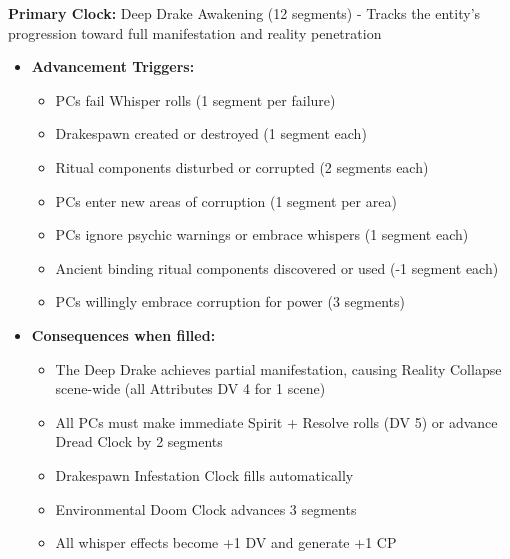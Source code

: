 \documentclass[11pt]{article}
\begin{document}
\textbf{Primary Clock:} Deep Drake Awakening (12 segments) - Tracks the entity's progression toward full manifestation and reality penetration
\begin{itemize}
\item \textbf{Advancement Triggers:}
  \begin{itemize}
  \item PCs fail Whisper rolls (1 segment per failure)
  \item Drakespawn created or destroyed (1 segment each)
  \item Ritual components disturbed or corrupted (2 segments each)
  \item PCs enter new areas of corruption (1 segment per area)
  \item PCs ignore psychic warnings or embrace whispers (1 segment each)
  \item Ancient binding ritual components discovered or used (-1 segment each)
  \item PCs willingly embrace corruption for power (3 segments)
  \end{itemize}
\item \textbf{Consequences when filled:}
  \begin{itemize}
  \item The Deep Drake achieves partial manifestation, causing Reality Collapse scene-wide (all Attributes DV 4 for 1 scene)
  \item All PCs must make immediate Spirit + Resolve rolls (DV 5) or advance Dread Clock by 2 segments
  \item Drakespawn Infestation Clock fills automatically
  \item Environmental Doom Clock advances 3 segments
  \item All whisper effects become +1 DV and generate +1 CP
  \end{itemize}
\end{itemize}
\end{document}
